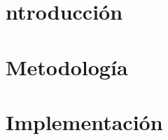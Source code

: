 \documentclass[11pt]{article}
\renewcommand{\{}{\left\lbrace}
\renewcommand{\}}{\right\rbrace}
\begin{document}
\section{ntroducción}


\section{Metodología}


\section{Implementación}

%
%
%
%
%
%


 


% 
% 
% 
\end{document}
